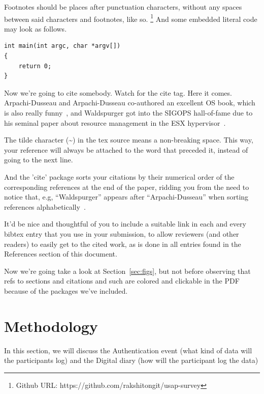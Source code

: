Footnotes should be places after punctuation characters, without any
spaces between said characters and footnotes, like so.%
\footnote{Github URL: https://github.com/rakshitongit/usap-survey} And some embedded literal code may
look as follows.

\begin{verbatim}
int main(int argc, char *argv[]) 
{
    return 0;
}
\end{verbatim}

Now we're going to cite somebody. Watch for the cite tag. Here it
comes. Arpachi-Dusseau and Arpachi-Dusseau co-authored an excellent OS
book, which is also really funny~\cite{arpachiDusseau18:osbook}, and
Waldspurger got into the SIGOPS hall-of-fame due to his seminal paper
about resource management in the ESX hypervisor~\cite{waldspurger02}.

The tilde character (\~{}) in the tex source means a non-breaking
space. This way, your reference will always be attached to the word
that preceded it, instead of going to the next line.

And the 'cite' package sorts your citations by their numerical order
of the corresponding references at the end of the paper, ridding you
from the need to notice that, e.g, ``Waldspurger'' appears after
``Arpachi-Dusseau'' when sorting references
alphabetically~\cite{waldspurger02,arpachiDusseau18:osbook}. 

It'd be nice and thoughtful of you to include a suitable link in each
and every bibtex entry that you use in your submission, to allow
reviewers (and other readers) to easily get to the cited work, as is
done in all entries found in the References section of this document.

Now we're going take a look at Section~\ref{sec:figs}, but not before
observing that refs to sections and citations and such are colored and
clickable in the PDF because of the packages we've included.

\section{Methodology}
\label{sec:method}




In this section, we will discuss the Authentication event (what kind of data will the participants log) and the Digital diary (how will the participant log the data)


